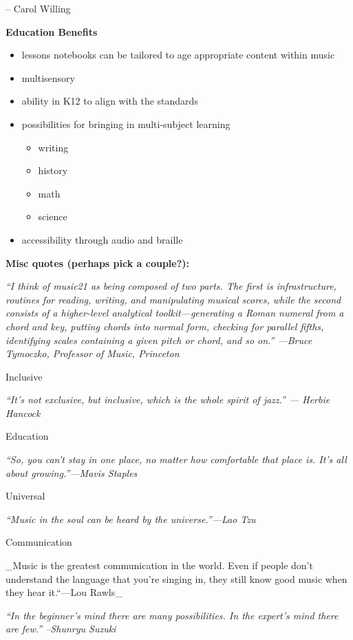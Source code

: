 \documentclass[]{book}
\providecommand{\tightlist}{%
  \setlength{\itemsep}{0pt}\setlength{\parskip}{0pt}}
\begin{document}
-- Carol Willing

\textbf{Education Benefits}

\begin{itemize}
\tightlist
\item
  lessons notebooks can be tailored to age appropriate content within
  music
\item
  multisensory
\item
  ability in K12 to align with the standards
\item
  possibilities for bringing in multi-subject learning

  \begin{itemize}
  \tightlist
  \item
    writing
  \item
    history
  \item
    math
  \item
    science
  \end{itemize}
\item
  accessibility through audio and braille
\end{itemize}

\textbf{Misc quotes (perhaps pick a couple?):}

\emph{``I think of music21 as being composed of two parts. The first is
infrastructure, routines for reading, writing, and manipulating musical
scores, while the second consists of a higher-level analytical
toolkit---generating a Roman numeral from a chord and key, putting
chords into normal form, checking for parallel fifths, identifying
scales containing a given pitch or chord, and so on.'' ---Bruce
Tymoczko, Professor of Music, Princeton}

Inclusive

\emph{``It's not exclusive, but inclusive, which is the whole spirit of
jazz.'' --- Herbie Hancock}

Education

\emph{``So, you can't stay in one place, no matter how comfortable that
place is. It's all about growing.''---Mavis Staples}

Universal

\emph{``Music in the soul can be heard by the universe.''---Lao Tzu}

Communication

\_Music is the greatest communication in the world. Even if people don't
understand the language that you're singing in, they still know good
music when they hear it.``---Lou Rawls\_

\emph{``In the beginner's mind there are many possibilities. In the
expert's mind there are few.'' --Shunryu Suzuki}
\end{document}
